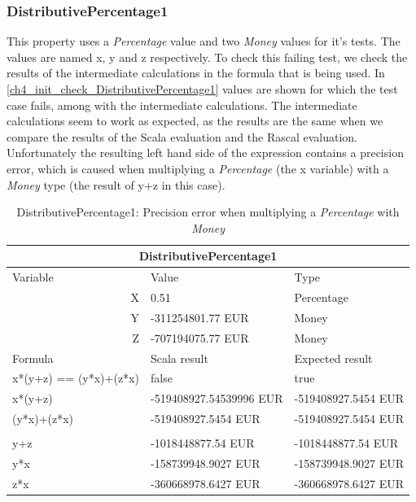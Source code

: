 \subsubsection{DistributivePercentage1}
\label{ssct:ch5_distributivePercentage1}
This property uses a \textit{Percentage} value and two \textit{Money} values for it's tests. The values are named x, y and z respectively. To check this failing test, we check the results of the intermediate calculations in the formula that is being used. In \autoref{ch4_init_check_DistributivePercentage1} values are shown for which the test case fails, among with the intermediate calculations. The intermediate calculations seem to work as expected, as the results are the same when we compare the results of the Scala evaluation and the Rascal evaluation. Unfortunately the resulting left hand side of the expression contains a precision error, which is caused when multiplying a \textit{Percentage} (the x variable) with a \textit{Money} type (the result of y+z in this case).
\FloatBarrier
\begin{table}[h!]
\centering
\begin{tabular}{|lll|}
\hline
\multicolumn{3}{|c|}{DistributivePercentage1}                          \\ \hline
Variable               & Value                   & Type                \\
\multicolumn{1}{|r}{X} & 0.51                    & Percentage          \\
\multicolumn{1}{|r}{Y} & -311254801.77 EUR       & Money               \\
\multicolumn{1}{|r}{Z} & -707194075.77 EUR       & Money               \\ \hline
Formula                & Scala result            & Expected result     \\
x*(y+z) == (y*x)+(z*x) & false                   & true                \\
x*(y+z)                & -519408927.54539996 EUR & -519408927.5454 EUR \\
(y*x)+(z*x)            & -519408927.5454 EUR     & -519408927.5454 EUR \\
                       &                         &                     \\
y+z                    & -1018448877.54 EUR      & -1018448877.54 EUR  \\
y*x                    & -158739948.9027 EUR     & -158739948.9027 EUR \\
z*x                    & -360668978.6427 EUR     & -360668978.6427 EUR \\ \hline
\end{tabular}
\caption{DistributivePercentage1: Precision error when multiplying a \textit{Percentage} with \textit{Money}}
\label{ch4_init_check_DistributivePercentage1}
\end{table}
\FloatBarrier

